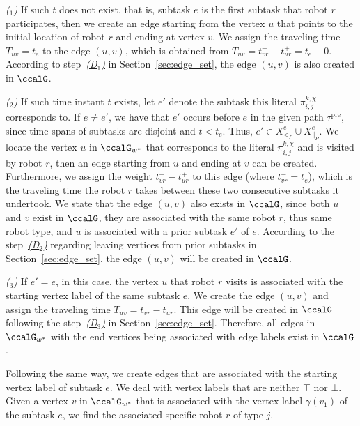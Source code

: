 \documentclass[Afour,sageh,times]{sagej}
\newcounter{mycounter}
\renewcommand{\ap}[3]{\mathcal{\pi}_{{#1},{#2}}^{#3}}
\begin{document}
{{{\it ($_1$)} If such $t$ does not exist, that is, subtask $e$ is the first subtask that robot $r$ participates, then we create an edge starting from the vertex $u$ that points to the initial location of robot $r$ and ending at vertex $v$. We assign the traveling time $T_{uv}=t_e$ to the edge $(u,v)$, which is obtained from  $T_{uv} = t_{vr}^- - t_{ur}^+ = t_e - 0$.
According to step~\hyperref[sec:a]{\it (D$_1$)} in Section~\ref{sec:edge_set}, the edge $(u,v)$ is  also  created in $\ccalG$.

{\it ($_2$)} If such time instant $t$ exists, let $e'$ denote the subtask this literal $\ap{i}{j}{k,\chi}$ corresponds to. If $e\neq e'$, we have that $e'$ occurs before $e$ in the given path $\tau^\text{pre}$, since time spans of subtasks are disjoint and $t < t_e$. Thus, $e' \in X_{<_P}^{e} \cup X_{\|_P}^e$. We locate the vertex $u$ in $\ccalG_{w^*}$ that corresponds to the literal $\ap{i}{j}{k,\chi}$ and is visited by robot $r$, then an edge starting from $u$ and ending at $v$ can be created. Furthermore, we assign the weight $t_{vr}^- - t_{ur}^+$ to this edge (where $t_{vr}^-=t_e$), which is the traveling time the robot $r$ takes between these two consecutive subtasks it undertook. We state that the edge $(u, v)$ also exists in $\ccalG$, since both $u$ and $v$ exist in $\ccalG$, they are associated with the same robot $r$, thus  same robot type, and $u$ is associated with a prior subtask $e'$ of $e$. According to the step~\hyperref[sec:b]{\it (D$_2$)} regarding leaving vertices from prior subtasks in Section~\ref{sec:edge_set}, the edge $(u,v)$ will be created in $\ccalG$.

{\it ($_3$)} If $e'=e$, in this case, the vertex $u$ that robot $r$ visits is associated with the starting vertex label of the same subtask  $e$. We create the edge $(u,v)$ and assign the traveling time  $T_{uv} = t_{vr}^- - t_{ur}^+$. This edge will be created in $\ccalG$ following the step~\hyperref[sec:c]{\it (D$_3$)} in Section~\ref{sec:edge_set}. Therefore, all edges in $\ccalG_{w^*}$ with the end vertices being associated with edge labels exist in $\ccalG$.


Following the same way, we create edges that are associated with the starting vertex label of subtask $e$. We deal with vertex labels that are neither $\top$ nor $\bot$. Given a vertex $v$ in $\ccalG_{w^*}$ that is associated with the vertex label $\gamma(v_1)$ of the subtask $e$,  we find  the associated specific  robot $r$ of type $j$.

}}
\end{document}
